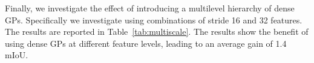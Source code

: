Finally, we investigate the effect of introducing a multilevel hierarchy of dense GPs. Specifically we investigate using combinations of stride 16 and 32 features. The results are reported in Table~\ref{tab:multiscale}. The results show the benefit of using dense GPs at different feature levels, leading to an average gain of 1.4 mIoU.








